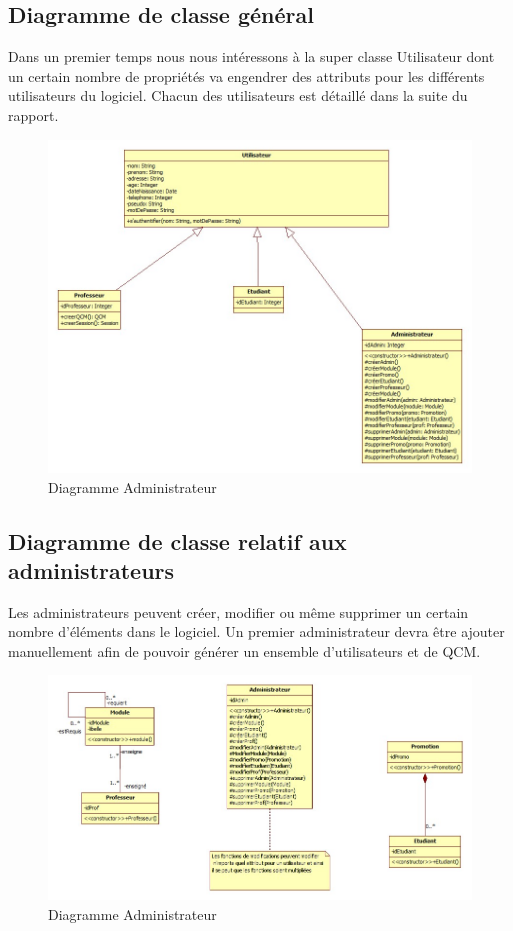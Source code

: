 \documentclass[10pt,a4paper,titlepage]{report}
\begin{document}
\subsection{Diagramme de classe général}
Dans un premier temps nous nous intéressons à la super classe Utilisateur dont un certain nombre de propriétés va engendrer des attributs pour les différents utilisateurs du logiciel.
Chacun des utilisateurs est détaillé dans la suite du rapport.
\begin{figure}[h!]
		\caption{Diagramme Administrateur}
		\centering
		\includegraphics[scale=0.4]{Include/classe/General.jpg}
\end{figure}\newpage
\subsection{Diagramme de classe relatif aux administrateurs}
Les administrateurs peuvent créer, modifier ou même supprimer un certain nombre d'éléments dans le logiciel. Un premier administrateur devra être ajouter manuellement afin de pouvoir générer un ensemble d'utilisateurs et de QCM.
\begin{figure}[h!]
		\caption{Diagramme Administrateur}
		\centering
		\includegraphics[scale=0.4]{Include/classe/Administrateur.jpg}
\end{figure}
\end{document}
